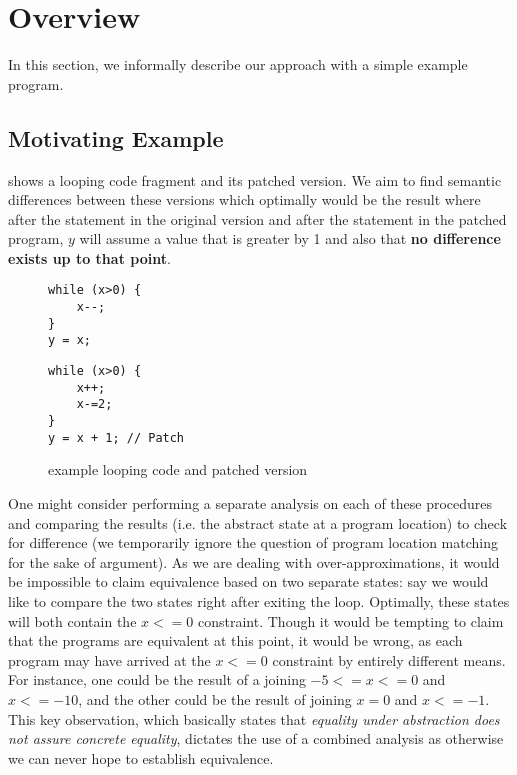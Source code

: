 \section{Overview} 

In this section, we informally describe our approach with a simple example program.

\subsection{Motivating Example}

 shows a looping code fragment and its patched version. We aim to find semantic differences between these versions which optimally would be the result where after the  statement in the original version and after the  statement in the patched program, $y$ will assume a value that is greater by 1 and also that \textbf{no difference exists up to that point}.

\begin{figure}[ht]
\begin{minipage}[b]{0.5\linewidth}
\centering
\begin{lstlisting}
while (x>0) {
    x--;
}
y = x;
\end{lstlisting}
\end{minipage}
\hspace{0.5cm}
\begin{minipage}[b]{0.5\linewidth}
\centering
\begin{lstlisting}
while (x>0) {
    x++;
    x-=2;
}
y = x + 1; // Patch
\end{lstlisting}
\end{minipage}
\caption{example looping code and patched version}
\end{figure}

One might consider performing a separate analysis on each of these procedures and comparing the results (i.e. the abstract state at a program location) to check for difference (we temporarily ignore the question of program location matching for the sake of argument). As we are dealing with over-approximations, it would be impossible to claim equivalence based on two separate states: say we would like to compare the two states right after exiting the loop. Optimally, these states will both contain the ${x<=0}$ constraint. Though it would be tempting to claim that the programs are equivalent at this point, it would be wrong, as each program may have arrived at the ${x<=0}$ constraint by entirely different means. For instance, one could be the result of a joining ${-5<=x<=0}$ and ${x<=-10}$, and the other could be the result of joining ${x=0}$ and ${x<=-1}$. This key observation, which basically states that \emph{equality under abstraction does not assure concrete equality}, dictates the use of a combined analysis as otherwise we can never hope to establish equivalence.

